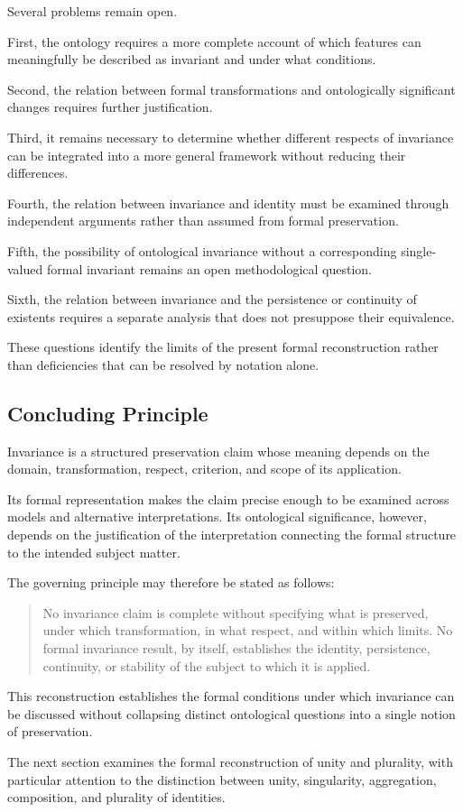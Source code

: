 Several problems remain open.

First, the ontology requires a more complete
account of which features can meaningfully
be described as invariant and under what
conditions.

Second, the relation between formal
transformations and ontologically significant
changes requires further justification.

Third, it remains necessary to determine
whether different respects of invariance
can be integrated into a more general
framework without reducing their differences.

Fourth, the relation between invariance
and identity must be examined through
independent arguments rather than assumed
from formal preservation.

Fifth, the possibility of ontological
invariance without a corresponding
single-valued formal invariant remains
an open methodological question.

Sixth, the relation between invariance
and the persistence or continuity of
existents requires a separate analysis
that does not presuppose their equivalence.

These questions identify the limits of
the present formal reconstruction rather
than deficiencies that can be resolved
by notation alone.

\subsection{Concluding Principle}

Invariance is a structured preservation
claim whose meaning depends on the
domain, transformation, respect, criterion,
and scope of its application.

Its formal representation makes the claim
precise enough to be examined across
models and alternative interpretations.
Its ontological significance, however,
depends on the justification of the
interpretation connecting the formal
structure to the intended subject matter.

The governing principle may therefore
be stated as follows:

\begin{quote}
No invariance claim is complete without
specifying what is preserved, under
which transformation, in what respect,
and within which limits. No formal
invariance result, by itself, establishes
the identity, persistence, continuity,
or stability of the subject to which
it is applied.
\end{quote}

This reconstruction establishes the
formal conditions under which invariance
can be discussed without collapsing
distinct ontological questions into
a single notion of preservation.

The next section examines the formal
reconstruction of unity and plurality,
with particular attention to the
distinction between unity, singularity,
aggregation, composition, and plurality
of identities.


